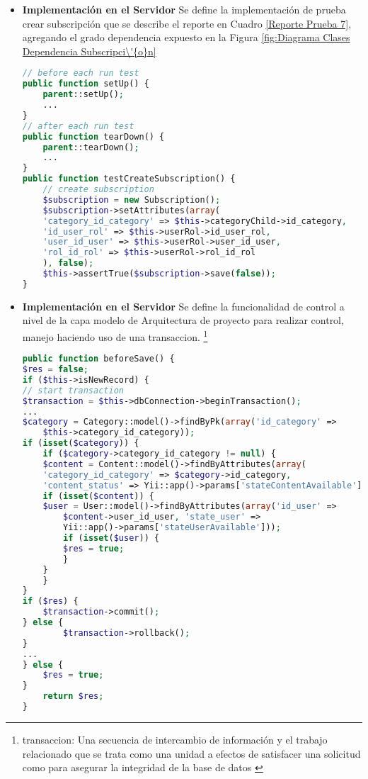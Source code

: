 \begin{itemize}

\item \textbf{Implementaci\'{o}n en el Servidor}
Se define la implementaci\'{o}n de prueba crear subscripci\'{o}n que se describe
el reporte en Cuadro \ref{Reporte Prueba 7}, agregando el grado dependencia
expuesto en la Figura \ref{fig:Diagrama Clases Dependencia Subscripci\'{o}n}

\begin{lstlisting}[language = PHP]
// before each run test
public function setUp() {
    parent::setUp();
    ...
}
// after each run test
public function tearDown() {
    parent::tearDown();
    ...
}
public function testCreateSubscription() {
    // create subscription
    $subscription = new Subscription();
    $subscription->setAttributes(array(
    'category_id_category' => $this->categoryChild->id_category,
    'id_user_rol' => $this->userRol->id_user_rol,
    'user_id_user' => $this->userRol->user_id_user,
    'rol_id_rol' => $this->userRol->rol_id_rol
    ), false);
    $this->assertTrue($subscription->save(false));
}
\end{lstlisting}

\item \textbf{Implementaci\'{o}n en el Servidor}
Se define la funcionalidad de control a nivel de la capa modelo de Arquitectura
de proyecto para realizar control, manejo haciendo uso de una transaccion. 
\footnote{transaccion: Una secuencia de intercambio de informaci\'{o}n y el 
trabajo relacionado que se trata como una unidad a efectos de satisfacer una
solicitud como para asegurar la integridad de la base de datos \cite{transaction}} 

\begin{lstlisting}[language = PHP]
public function beforeSave() {
$res = false;
if ($this->isNewRecord) {
// start transaction
$transaction = $this->dbConnection->beginTransaction();
...
$category = Category::model()->findByPk(array('id_category' => 
    $this->category_id_category));
if (isset($category)) {
    if ($category->category_id_category != null) {
    $content = Content::model()->findByAttributes(array(
    'category_id_category' => $category->id_category, 
    'content_status' => Yii::app()->params['stateContentAvailable']));
    if (isset($content)) {
    $user = User::model()->findByAttributes(array('id_user' => 
        $content->user_id_user, 'state_user' => 
        Yii::app()->params['stateUserAvailable']));
        if (isset($user)) {
        $res = true;
        }
    }
    }
}
if ($res) {
    $transaction->commit();
} else {
        $transaction->rollback();
}
...
} else {
    $res = true;
}
    return $res;
}
\end{lstlisting}

\end{itemize}

